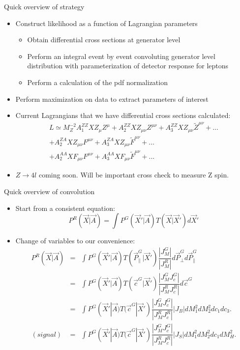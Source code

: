 \documentclass[11pt,t]{beamer}
\begin{document}
\begin{frame}{Quick overview of strategy}
   \begin{itemize}
   \item Construct likelihood as a function of Lagrangian parameters
      \begin{itemize}
      \item Obtain differential cross sections at generator level
      \item Perform an integral event by event convoluting generator level distribution
      with parameterization of detector response for leptons
      \item Perform a calculation of the pdf normalization
      \end{itemize}
   \item Perform maximization on data to extract parameters of interest
   \item Current Lagrangians that we have differential cross sections calculated:
   \begin{eqnarray}
   L \simeq M_Z^{-2} A_1^{ZZ} X Z_\mu Z^\mu + A_2^{ZZ} X Z_{\mu\nu} Z^{\mu\nu} + A_3^{ZZ} X Z_{\mu\nu} \tilde{Z}^{\mu\nu} + ...\nonumber\\
   + A_2^{ZA} X Z_{\mu\nu} F^{\mu\nu} + A_3^{ZA} X Z_{\mu\nu} \tilde{F}^{\mu\nu}\nonumber + ...\nonumber\\
   + A_2^{AA} X F_{\mu\nu} F^{\mu\nu} + A_3^{AA} X F_{\mu\nu} \tilde{F}^{\mu\nu}\nonumber + ...\nonumber
   \end{eqnarray}
   \item $Z \rightarrow 4l$ coming soon.  Will be important cross check to measure Z spin.
   \end{itemize}
\end{frame}

\begin{frame}{Quick overview of convolution}
   \begin{itemize}
   \item Start from a consistent equation:
   \begin{equation}
      P^R(\vec{X} | \vec{A}) = \int P^G(\vec{X}' | \vec{A}) T(\vec{X} | \vec{X}') d \vec{X}'\nonumber
   \end{equation}
   \item Change of variables to our convenience:
   \begin{eqnarray}
      P^R(\vec{X} | \vec{A}) &=& \int P^G(\vec{X}' | \vec{A}) T(\vec{P}^G_\parallel | \vec{X}') \dfrac{|J_M^G|}{|J_M^R|} d \vec{P}^G_\perp d \vec{P}^G_\parallel\nonumber\\
         &=& \int P^G(\vec{X}' | \vec{A}) T(\vec{c}^G | \vec{X}') \dfrac{|J_M^G J_c^G|}{|J_M^R J_c^R|} d \vec{c}^G\nonumber\\
         &=& \int P^G(\vec{X}' | \vec{A}) T(\vec{c}^G | \vec{X}') \dfrac{|J_M^G J_c^G|}{|J_M^R J_c^R|} |J_B| d M_1^2 d M_2^2 d c_1 d c_3.\nonumber\\
        (signal)  &=& \int P^G(\vec{X}' | \vec{A}) T(\vec{c}^G | \vec{X}') \dfrac{|J_M^G J_c^G|}{|J_M^R J_c^R|} |J_S| d M_1^2 d M_2^2 d c_1 d M_H^2.\nonumber
   \end{eqnarray}
   \end{itemize}
\end{frame}
\end{document}
